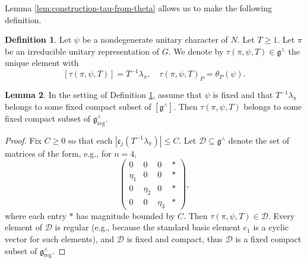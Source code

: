 \documentclass[reqno]{amsart}
\DeclareMathOperator{\reg}{reg}
\theoremstyle{plain} \newtheorem{theorem} {Theorem}
\theoremstyle{definition} \newtheorem{definition} [theorem] {Definition}
\theoremstyle{itplain} %
\newtheorem{lemma}[theorem]{Lemma}
\numberwithin{equation}{section}
\numberwithin{theorem}{section}
\renewcommand{\geq}{\geqslant}
\renewcommand{\leq}{\leqslant}
\begin{document}
Lemma \ref{lem:construction-tau-from-theta} allows us to make the following definition.
\begin{definition}\label{defn:parameter-tau-pi-T}
  Let $\psi$ be a nondegenerate unitary character of $N$.  Let $T \geq 1$.  Let $\pi$ be an irreducible unitary representation of $G$.  We denote by $\tau(\pi,\psi,T) \in \mathfrak{g}^\wedge$ the unique element with 
  \begin{equation}\label{eq:tau-characterize-via-pi}
  [\tau(\pi,\psi,T)] = T^{-1} \lambda_\pi,
  \quad
  \tau(\pi,\psi,T)_P = \theta_P(\psi).
\end{equation}
\end{definition}


\begin{lemma}
  In the setting of Definition \ref{defn:parameter-tau-pi-T}, assume that $\psi$ is fixed and that $T^{-1} \lambda_\pi$ belongs to some fixed compact subset of $[\mathfrak{g}^\wedge]$.  Then $\tau(\pi,\psi,T)$ belongs to some fixed compact subset of $\mathfrak{g}^\wedge_{\reg}$.
\end{lemma}
\begin{proof}
  Fix $C \geq 0$ so that each $|\mathfrak{c}_j (T^{-1} \lambda_\pi)| \leq C$.  Let $\mathcal{D} \subseteq \mathfrak{g}^\wedge$ denote the set of matrices of the form, e.g., for $n=4$,
  \begin{equation*}
    \begin{pmatrix}
      0 & 0 & 0 & \ast \\
      \eta_1  & 0 & 0 & \ast \\
      0 & \eta_2  & 0 & \ast \\
      0 & 0 & \eta_3  &  \ast
    \end{pmatrix},
  \end{equation*}
  where each entry $\ast$ has magnitude bounded by $C$.  Then $\tau(\pi,\psi,T) \in \mathcal{D}$.   Every element of $\mathcal{D}$ is regular (e.g., because the standard basis element $e_1$ is a cyclic vector for such elements), and $\mathcal{D}$ is fixed and compact, thus $\mathcal{D}$ is a fixed compact subset of $\mathfrak{g}^\wedge_{\reg}$.
\end{proof}
\end{document}
